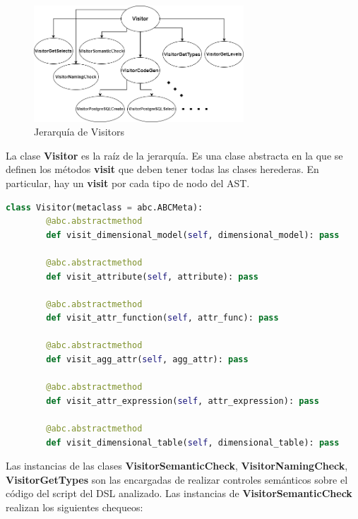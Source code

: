 \begin{figure}[htb]
    \centering
    \includegraphics[width=0.7\textwidth]{Graphics/visitorfixed.drawio.png}
    \caption{Jerarquía de Visitors}
    \label{fig:visitors}
\end{figure}

La clase \textbf{Visitor} es la raíz de la jerarquía. Es una clase abstracta en la que se definen los métodos 
\textbf{visit} que deben tener todas las clases herederas. En particular, hay un \textbf{visit} por cada tipo de 
nodo del AST. 

\begin{lstlisting}[label={code:visitors}, caption={Clase Visitor}, language={python}]
    class Visitor(metaclass = abc.ABCMeta):
        @abc.abstractmethod
        def visit_dimensional_model(self, dimensional_model): pass 

        @abc.abstractmethod
        def visit_attribute(self, attribute): pass

        @abc.abstractmethod
        def visit_attr_function(self, attr_func): pass

        @abc.abstractmethod
        def visit_agg_attr(self, agg_attr): pass

        @abc.abstractmethod
        def visit_attr_expression(self, attr_expression): pass

        @abc.abstractmethod
        def visit_dimensional_table(self, dimensional_table): pass
\end{lstlisting}

Las instancias de las clases \textbf{VisitorSemanticCheck}, \textbf{VisitorNamingCheck}, \textbf{VisitorGetTypes} 
son las encargadas de realizar
controles semánticos sobre el código del script del DSL analizado. Las instancias de \textbf{VisitorSemanticCheck} realizan los siguientes 
chequeos:

